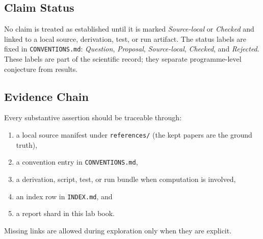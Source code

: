 \subsection{Claim Status}

No claim is treated as established until it is marked \emph{Source-local} or
\emph{Checked} and linked to a local source, derivation, test, or run artifact.
The status labels are fixed in \texttt{CONVENTIONS.md}: \emph{Question},
\emph{Proposal}, \emph{Source-local}, \emph{Checked}, and \emph{Rejected}. These
labels are part of the scientific record; they separate programme-level
conjecture from results.

\subsection{Evidence Chain}

Every substantive assertion should be traceable through:

\begin{enumerate}
  \item a local source manifest under \texttt{references/} (the kept papers are
  the ground truth),
  \item a convention entry in \texttt{CONVENTIONS.md},
  \item a derivation, script, test, or run bundle when computation is involved,
  \item an index row in \texttt{INDEX.md}, and
  \item a report shard in this lab book.
\end{enumerate}

Missing links are allowed during exploration only when they are explicit.
